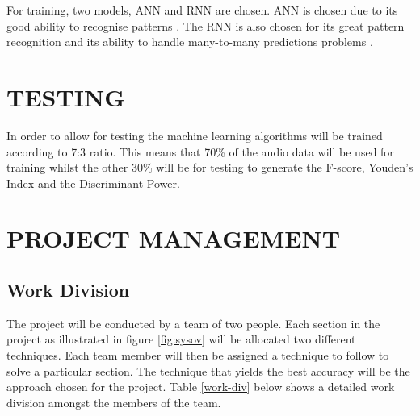 \documentclass[10pt,twocolumn]{witseiepaper}
\begin{document}
For training, two models, ANN and RNN are chosen. ANN is chosen due to its good ability to recognise patterns \cite{demuth2014neural}. The RNN is also chosen for its great pattern recognition and its ability to handle many-to-many predictions problems \cite{he2019automatic}.
\newpage
\section{TESTING}
In order to allow for testing the machine learning algorithms will be trained according to 7:3 ratio. This means that 70\% of the audio data will be used for training whilst the other 30\% will be for testing to generate the F-score, Youden’s Index and the Discriminant Power.

%



\section{PROJECT MANAGEMENT}

\subsection{Work Division}
The project will be conducted by a team of two people. Each section in the project as illustrated in figure \ref{fig:sysov}
will be allocated two different techniques. Each team member will then be assigned a technique to follow to solve a particular section. The technique that yields the best accuracy will be the approach chosen for the project. Table \ref{work-div} below shows a detailed work division amongst the members of the team.
\end{document}
